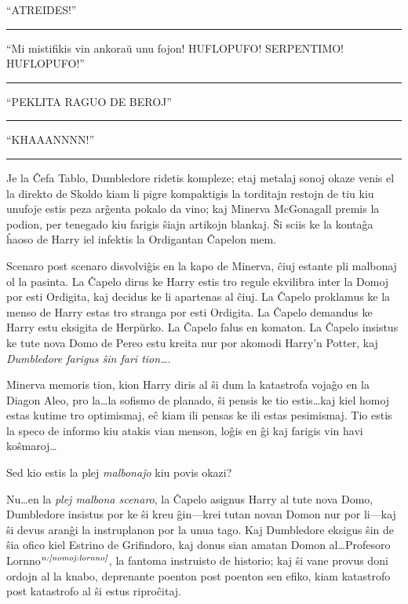 ``ATREIDES!''

\begin{center}\rule{3in}{0.4pt}\end{center}

``Mi mistifikis vin ankoraŭ unu fojon! HUFLOPUFO! SERPENTIMO!
HUFLOPUFO!''

\begin{center}\rule{3in}{0.4pt}\end{center}

``PEKLITA RAGUO DE BEROJ''

\begin{center}\rule{3in}{0.4pt}\end{center}

``KHAAANNNN!''

\begin{center}\rule{3in}{0.4pt}\end{center}

Je la Ĉefa Tablo, Dumbledore ridetis kompleze; etaj metalaj sonoj
okaze venis el la direkto de Skoldo kiam li pigre kompaktigis la
torditajn restojn de tiu kiu unufoje estis peza arĝenta pokalo da
vino; kaj Minerva McGonagall premis la podion, per tenegado kiu
farigis ŝiajn artikojn blankaj. Ŝi sciis ke la kontaĝa ĥaoso de Harry
iel infektis la Ordigantan Ĉapelon mem.

Scenaro post scenaro disvolviĝis en la kapo de Minerva, ĉiuj estante
pli malbonaj ol la pasinta.  La Ĉapelo dirus ke Harry estis tro regule
ekvilibra inter la Domoj por esti Ordigita, kaj decidus ke li
apartenas al ĉiuj. La Ĉapelo proklamus ke la menso de Harry estas tro
stranga por esti Ordigita. La Ĉapelo demandus ke Harry estu eksigita
de Herpŭrko. La Ĉapelo falus en komaton. La Ĉapelo insistus ke tute
nova Domo de Pereo estu kreita nur por akomodi Harry'n Potter, kaj
\emph{Dumbledore farigus ŝin fari tion\ldots}.

Minerva memoris tion, kion Harry diris al ŝi dum la katastrofa vojaĝo
en la Diagon Aleo, pro la\ldots la sofismo de planado, ŝi pensis ke
tio estis\ldots kaj kiel homoj estas kutime tro optimismaj, eĉ kiam
ili pensas ke ili estas pesimismaj. Tio estis la speco de informo kiu
atakis vian menson, loĝis en ĝi kaj farigis vin havi koŝmaroj\ldots

Sed kio estis la plej \emph{malbonaĵo} kiu povis okazi?

Nu\ldots en la \emph{plej malbona scenaro}, la Ĉapelo asignus Harry al
tute nova Domo, Dumbledore insistus por ke ŝi kreu ĝin—krei tutan
novan Domon nur por li—kaj ŝi devus aranĝi la instruplanon por la unua
tago. Kaj Dumbledore eksigus ŝin de ŝia ofico kiel Estrino de
Grifindoro, kaj donus sian amatan Domon al\ldots Profesoro
Lornno$^{\textit{n:\ref{nomoj:lornno}}}$, la fantoma instruisto de historio; kaj
ŝi vane provus doni ordojn al la knabo, deprenante poenton post
poenton sen efiko, kiam katastrofo post katastrofo al ŝi estus
riproĉitaj.

